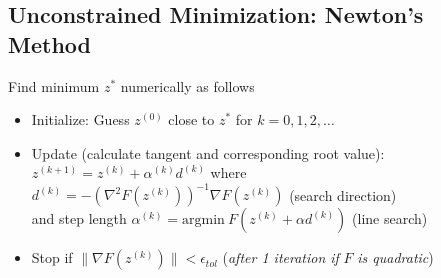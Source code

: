 \documentclass[english]{latex4ei/latex4ei_sheet}
\begin{document}
\begin{sectionbox}
\subsection{Unconstrained Minimization: Newton's Method}
Find minimum $z^{*}$ numerically as follows
\begin{itemize}
    \item Initialize: Guess $z^{(0)}$ close to $z^{*}$ for $k=0,1,2,\ldots$
    \item Update (calculate tangent and corresponding root value):\\
    $z^{(k+1)}=z^{(k)}+\alpha^{(k)} d^{(k)}$ where\\ $d^{(k)}=-\left(\nabla^{2} F\left(z^{(k)}\right)\right)^{-1} \nabla F\left(z^{(k)}\right)$ (search direction)\\
    and step length $\alpha^{(k)}=\textrm{argmin}\ F(z^{(k)}+\alpha d^{(k)})$ (line search)
    \item Stop if $\|\nabla F(z^{(k)})\|<\epsilon_{tol}$ (\textit{after 1 iteration if} $F$ \textit{is quadratic})
\end{itemize}\vspace{0.2cm}


\end{sectionbox}
\end{document}
